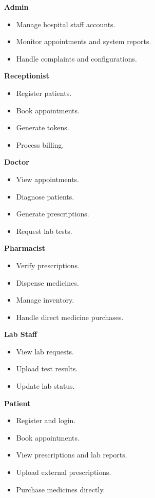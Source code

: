 \textbf{Admin}
\begin{itemize}
\item Manage hospital staff accounts.
\item Monitor appointments and system reports.
\item Handle complaints and configurations.
\end{itemize}

\textbf{Receptionist}
\begin{itemize}
\item Register patients.
\item Book appointments.
\item Generate tokens.
\item Process billing.
\end{itemize}

\textbf{Doctor}
\begin{itemize}
\item View appointments.
\item Diagnose patients.
\item Generate prescriptions.
\item Request lab tests.
\end{itemize}

\textbf{Pharmacist}
\begin{itemize}
\item Verify prescriptions.
\item Dispense medicines.
\item Manage inventory.
\item Handle direct medicine purchases.
\end{itemize}

\textbf{Lab Staff}
\begin{itemize}
\item View lab requests.
\item Upload test results.
\item Update lab status.
\end{itemize}

\textbf{Patient}
\begin{itemize}
\item Register and login.
\item Book appointments.
\item View prescriptions and lab reports.
\item Upload external prescriptions.
\item Purchase medicines directly.
\end{itemize}